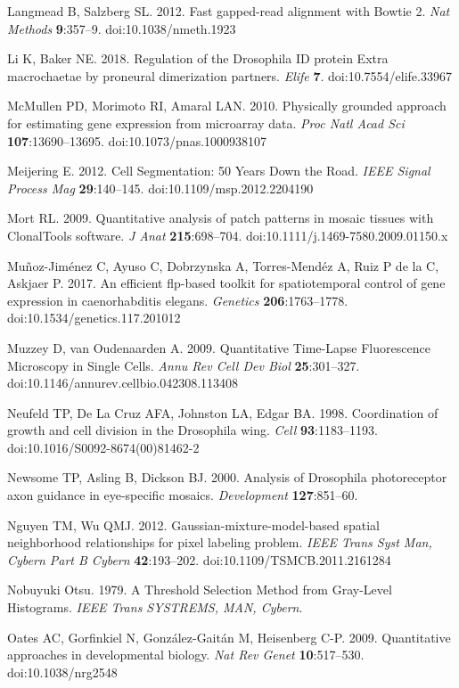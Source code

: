 Langmead B, Salzberg SL. 2012. Fast gapped-read alignment with Bowtie 2. \emph{Nat Methods} \textbf{9}:357--9. doi:10.1038/nmeth.1923

Li K, Baker NE. 2018. Regulation of the Drosophila ID protein Extra macrochaetae by proneural dimerization partners. \emph{Elife} \textbf{7}. doi:10.7554/elife.33967

McMullen PD, Morimoto RI, Amaral LAN. 2010. Physically grounded approach for estimating gene expression from microarray data. \emph{Proc Natl Acad Sci} \textbf{107}:13690--13695. doi:10.1073/pnas.1000938107

Meijering E. 2012. Cell Segmentation: 50 Years Down the Road. \emph{IEEE Signal Process Mag} \textbf{29}:140--145. doi:10.1109/msp.2012.2204190

Mort RL. 2009. Quantitative analysis of patch patterns in mosaic tissues with ClonalTools software. \emph{J Anat} \textbf{215}:698--704. doi:10.1111/j.1469-7580.2009.01150.x

Muñoz-Jiménez C, Ayuso C, Dobrzynska A, Torres-Mendéz A, Ruiz P de la C, Askjaer P. 2017. An efficient flp-based toolkit for spatiotemporal control of gene expression in caenorhabditis elegans. \emph{Genetics} \textbf{206}:1763--1778. doi:10.1534/genetics.117.201012

Muzzey D, van Oudenaarden A. 2009. Quantitative Time-Lapse Fluorescence Microscopy in Single Cells. \emph{Annu Rev Cell Dev Biol} \textbf{25}:301--327. doi:10.1146/annurev.cellbio.042308.113408

Neufeld TP, De La Cruz AFA, Johnston LA, Edgar BA. 1998. Coordination of growth and cell division in the Drosophila wing. \emph{Cell} \textbf{93}:1183--1193. doi:10.1016/S0092-8674(00)81462-2

Newsome TP, Asling B, Dickson BJ. 2000. Analysis of Drosophila photoreceptor axon guidance in eye-specific mosaics. \emph{Development} \textbf{127}:851--60.

Nguyen TM, Wu QMJ. 2012. Gaussian-mixture-model-based spatial neighborhood relationships for pixel labeling problem. \emph{IEEE Trans Syst Man, Cybern Part B Cybern} \textbf{42}:193--202. doi:10.1109/TSMCB.2011.2161284

Nobuyuki Otsu. 1979. A Threshold Selection Method from Gray-Level Histograms. \emph{IEEE Trans SYSTREMS, MAN, Cybern}.

Oates AC, Gorfinkiel N, González-Gaitán M, Heisenberg C-P. 2009. Quantitative approaches in developmental biology. \emph{Nat Rev Genet} \textbf{10}:517--530. doi:10.1038/nrg2548

